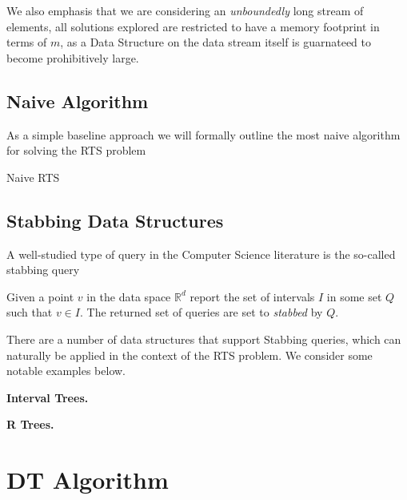 We also emphasis that we are considering an \textit{unboundedly} long stream of elements, all solutions explored are restricted to have a memory footprint in terms of $m$, as a Data Structure on the data stream itself is guarnateed to become prohibitively large.

\subsection{Naive Algorithm}
\label{sec:naive-algorithm}

As a simple baseline approach we will formally outline the most naive algorithm for solving the RTS problem

\begin{algorithm}
\caption{Naive RTS}\label{alg:naive-rts}
\begin{algorithmic}[1]
\State {}
\State {}
\State {}
\EndFor
\EndFor
\EndProcedure
\end{algorithmic}
\end{algorithm}

\subsection{Stabbing Data Structures}
\label{sec:stabbing-data-structs}

A well-studied type of query in the Computer Science literature is the so-called stabbing query

\begin{definition} Given a point $v$ in the data space $\mathbb{R}^d$ report the set of intervals $I$ in some set $Q$ such that $v \in I$. The returned set of queries are set to \textit{stabbed} by $Q$.
\end{definition}

There are a number of data structures \cite{DBLP:conf/soda/Rahul15} that support Stabbing queries, which can naturally be applied in the context of the RTS problem. We consider some notable examples below. 

\textbf{Interval Trees.}

\textbf{R Trees.}

\section{DT Algorithm}
\label{sec:DT-algorithm}


